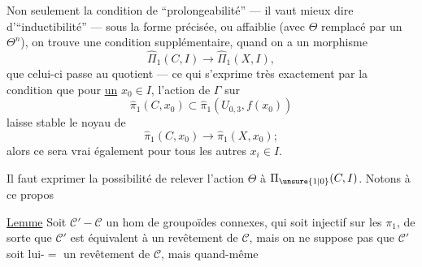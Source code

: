 Non seulement la condition de  ``prolongeabilité'' --- il vaut mieux dire d'``inductibilité'' --- sous la forme précisée, ou affaiblie (avec $\Theta$ remplacé par un $\Theta^n$), on trouve une condition supplémentaire, quand on a  un morphisme
\[
\widehat\Pi_1(C,I)\longrightarrow\widehat\Pi_1(X,I),
\]
que celui-ci passe au quotient --- ce qui s'exprime très exactement par la condition que pour \uline{un} $x_0\in I$, l'action de $\Gamma$ sur
\[
\widehat\pi_1(C,x_0)\subset\widehat\pi_1(U_{0,3},f(x_0))
\]
laisse stable le noyau de
\[
\widehat\pi_1(C,x_0)\longrightarrow\widehat\pi_1(X,x_0);
\]
alors ce sera vrai également pour tous les autres $x_i\in I$.

Il faut exprimer la possibilité de relever l'action  $\Theta$ à $\Pi_{\unsure{1|0}}(C,I)$. Notons à ce propos

\uline{Lemme} Soit $\mathcal C'-\mathcal C$ un hom de groupoïdes connexes, qui soit injectif sur les $\pi_1$,  de sorte que $\mathcal C'$ est équivalent à un revêtement de $\mathcal C$, mais on ne suppose pas que $\mathcal C'$ soit lui-$=$ un revêtement de $\mathcal C$, mais quand-même 

